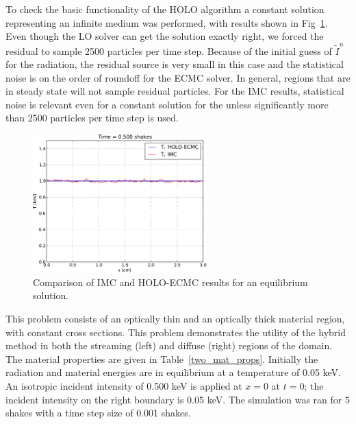 \documentclass{mc2013}
\begin{document}

To check the basic functionality of the HOLO algorithm a constant solution
representing an infinite medium was performed, with results shown in Fig~\ref{constant_fig}.  Even though the LO solver can get the
solution exactly right, we forced the residual to sample 2500 particles per time step.  Because of
the initial guess of $\tilde I^n$ for the radiation, the residual source is very small in
this case and the statistical noise is on the order of roundoff for the ECMC solver.
In general, regions that are in steady state will not sample residual particles.
  For the IMC results, statistical noise is relevant even for a constant solution for the
unless significantly more than 2500 particles per time step is used. 
\begin{figure}[htb]
   \centering
   \includegraphics[width=0.6\textwidth]{constant.pdf}
   \caption{\label{constant_fig} Comparison of IMC and HOLO-ECMC results for
       an equilibrium solution.}
\end{figure}



This problem consists of an optically thin and an optically thick material region,
with constant cross sections.  This problem demonstrates the utility of the
hybrid method in both the streaming (left) and diffuse (right) regions of the domain.  The material properties are given in
Table~\ref{two_mat_props}.  Initially the radiation and material energies are in
equilibrium at a temperature of 0.05 keV.  An isotropic incident intensity of 0.500 keV
is applied at $x=0$ at $t=0$; the incident intensity on the right boundary is 0.05
keV.  The simulation was ran for 5 shakes with a
time step size of 0.001 shakes.  
\end{document}
